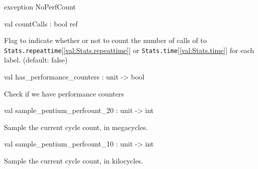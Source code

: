 \documentclass[11pt]{article}
\begin{document}
\label{exception:Stats.NoPerfCount}\begin{ocamldoccode}
exception NoPerfCount
\end{ocamldoccode}




\label{val:Stats.countCalls}\begin{ocamldoccode}
val countCalls : bool ref
\end{ocamldoccode}
\begin{ocamldocdescription}
Flag to indicate whether or not to count the number of calls of
    to {\tt{Stats.repeattime}}[\ref{val:Stats.repeattime}] or {\tt{Stats.time}}[\ref{val:Stats.time}] for each label.
    (default: false)


\end{ocamldocdescription}




\label{val:Stats.has-underscoreperformance-underscorecounters}\begin{ocamldoccode}
val has_performance_counters : unit -> bool
\end{ocamldoccode}
\begin{ocamldocdescription}
Check if we have performance counters


\end{ocamldocdescription}




\label{val:Stats.sample-underscorepentium-underscoreperfcount-underscore20}\begin{ocamldoccode}
val sample_pentium_perfcount_20 : unit -> int
\end{ocamldoccode}
\begin{ocamldocdescription}
Sample the current cycle count, in megacycles.


\end{ocamldocdescription}




\label{val:Stats.sample-underscorepentium-underscoreperfcount-underscore10}\begin{ocamldoccode}
val sample_pentium_perfcount_10 : unit -> int
\end{ocamldoccode}
\begin{ocamldocdescription}
Sample the current cycle count, in kilocycles.


\end{ocamldocdescription}
\end{document}
